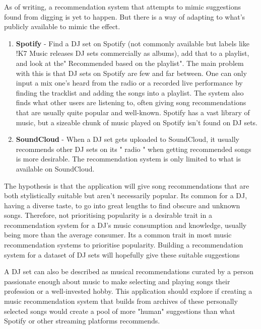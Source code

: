 As of writing, a recommendation system that attempts to mimic suggestions found from digging is yet to happen. But there is a way of adapting to what's publicly available to mimic the effect.

\begin{enumerate}
	\item \textbf{Spotify }- Find a DJ set on Spotify (not commonly available but labels like !K7 Music
	releases DJ sets commercially as albums), add that to a playlist, and look at the"
	Recommended based on the playlist". The main problem with this is that DJ sets on
	Spotify are few and far between. One can only input a mix one’s heard from the radio or
	a recorded live performance by finding the tracklist and adding the songs into a playlist.
	The system also finds what other users are listening to, often giving song recommendations
	that are usually quite popular and well-known. Spotify has a vast library of music, but a
	sizeable chunk of music played on Spotify isn’t found on DJ sets.
	
	\item \textbf{SoundCloud }- When a DJ set gets uploaded to SoundCloud, it usually recommends other DJ sets on its " radio " when getting recommended songs is more desirable. The recommendation system is only limited to what is available on SoundCloud.
	
\end{enumerate}
	
The hypothesis is that the application will give song recommendations that are both stylistically
suitable but aren’t necessarily popular. Its common for a DJ, having a diverse taste, to go into
great lengths to find obscure and unknown songs. Therefore, not prioritising popularity is a
desirable trait in a recommendation system for a DJ’s music consumption and knowledge, usually
being more than the average consumer. Its a common trait in most music recommendation
systems to prioritise popularity. Building a recommendation system for a dataset of DJ sets
will hopefully give these suitable suggestions	

A DJ set can also be described as musical recommendations curated by a person passionate
enough about music to make selecting and playing songs their profession or a well-invested
hobby. This application should explore if creating a music recommendation system that builds
from archives of these personally selected songs would create a pool of more "human"
suggestions than what Spotify or other streaming platforms recommends.

